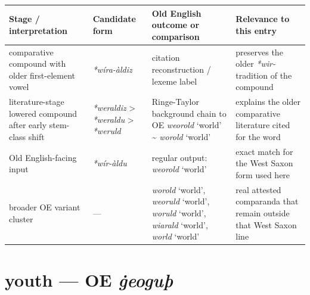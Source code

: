 \documentclass[
  british,
  a4paper,
  openany]{book}
\newcounter{none} %
\providecommand{\Recon}[1]{\emph{*#1}}
{\catcode`→=\active \global\def→{\ensuremath{\rightarrow}}}
\providecommand{\texorpdfstring}[2]{#1}
\providecommand{\Recon}[1]{\emph{*#1}}
{\catcode`→=\active \global\def→{\ensuremath{\rightarrow}}}
\begin{document}
{\def\LTcaptype{none} %
\begin{longtable}[]{@{}
  >{\raggedright\arraybackslash}p{}
  >{\raggedright\arraybackslash}p{}
  >{\raggedright\arraybackslash}p{}
  >{\raggedright\arraybackslash}p{}@{}}
\toprule\noalign{}
\begin{minipage}[b]{\linewidth}\raggedright
Stage / interpretation
\end{minipage} & \begin{minipage}[b]{\linewidth}\raggedright
Candidate form
\end{minipage} & \begin{minipage}[b]{\linewidth}\raggedright
Old English outcome or comparison
\end{minipage} & \begin{minipage}[b]{\linewidth}\raggedright
Relevance to this entry
\end{minipage} \\
\midrule\noalign{}
\endhead
\bottomrule\noalign{}
\endlastfoot
comparative compound with older first-element vowel &
{\emph{*wíra-àldiz}} & citation reconstruction / lexeme label &
preserves the older \emph{*wir-} tradition of the compound \\
literature-stage lowered compound after early stem-class shift &
{\Recon{weraldiz}} \textgreater{} {\Recon{weraldu}} \textgreater{}
{\Recon{weruld}} & Ringe-Taylor background chain to OE {\emph{weorold}}
`world' \textasciitilde{} {\emph{worold}} `world' & explains the older
comparative literature cited for the word \\
Old English-facing input & {\emph{*wír-àldu}} & regular output:
{\emph{weorold}} `world' & exact match for the West Saxon form used
here \\
broader OE variant cluster & --- & {\emph{worold}} `world',
{\emph{weoruld}} `world', {\emph{woruld}} `world', {\emph{wiarald}}
`world', {\emph{world}} `world' & real attested comparanda that remain
outside that West Saxon line \\
\end{longtable}
}

\section{\texorpdfstring{youth --- OE
\emph{ġeoguþ}}{youth --- OE ġeoguþ}}\label{youth-oe-ux121eoguuxfe}
\end{document}
